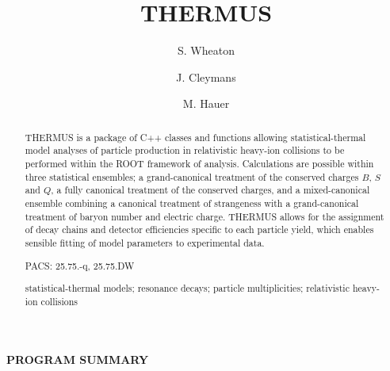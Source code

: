 \documentclass{elsarticle}
\begin{document}
\begin{frontmatter}

\title{THERMUS}

\author[uct]{S. Wheaton}
\author[uct]{J. Cleymans}
\author[uct,b]{M. Hauer}


\address[uct]{{\it UCT-CERN Research Centre and Department  of  Physics, University of Cape Town, Rondebosch 7701, South Africa}}
\address[b]{Helmholtz Research School, University of Frankfurt, Frankfurt, Germany}

\begin{abstract}

THERMUS is a package of C++ classes and functions allowing statistical-thermal 
model analyses of particle production in relativistic heavy-ion collisions to 
be performed within the ROOT framework of analysis. Calculations are possible 
within three statistical ensembles; a grand-canonical treatment of the 
conserved charges $B$, $S$ and $Q$, a fully canonical treatment of the 
conserved charges, and a mixed-canonical ensemble combining a canonical 
treatment of strangeness with a grand-canonical treatment of baryon number and 
electric charge. THERMUS allows 
for the 
assignment of decay chains and detector efficiencies specific to each 
particle yield, which enables sensible fitting of model parameters to 
experimental data.    

\begin{flushleft}
PACS: 25.75.-q, 25.75.DW

\end{flushleft}

\begin{keyword}
statistical-thermal models; resonance decays; particle multiplicities; relativistic heavy-ion collisions
\end{keyword}

\end{abstract}


\end{frontmatter}


\pagebreak

{\bf PROGRAM SUMMARY}
\end{document}
